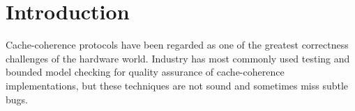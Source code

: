 \documentclass[sigplan,10pt,review,anonymous,screen]{acmart}\settopmatter{printfolios=true,printccs=false,printacmref=false}
\begin{document}
\newcommand{\amsgi}[1]{\ensuremath{#1^{\textrm{init}}}}
\newcommand{\amsge}[1]{\ensuremath{#1^{\textrm{end}}}}

\newcommand{\hseq}[2]{\ensuremath{#1 \parallel #2}}
\newcommand{\hsrzl}[2]{\ensuremath{\mathit{Serializable}\ #1\ #2}}
\newcommand{\hsrz}[1]{\ensuremath{\mathit{Serializable}\ #1}}

\newcommand{\strsn}[2]{\ensuremath{#1 \sswarrow_{s} #2}}
\newcommand{\hsseq}[3]{\ensuremath{#1 \parallel_{#3} #2}}


\newcommand*\rdrecsm[1]{
  \adjustbox{raise=.1ex, margin=-1pt}{
    \tikz[baseline=(char.base)]{
      \node[shape=rectangle, draw, inner sep=0pt, minimum size=7pt, fill=white, text=mordantred19]
      (char) {\scriptsize\sffamily\bf #1};}}
}
\newcommand*\blrecsm[1]{
  \adjustbox{raise=.1ex, margin=-1pt}{
    \tikz[baseline=(char.base)]{
      \node[shape=rectangle, draw, inner sep=0pt, minimum size=7pt, fill=white, text=mediumtealblue]
      (char) {\scriptsize\sffamily\bf #1};}}
}

\newcommand*\rdcircf[1]{
  \adjustbox{raise=.2ex, margin=-2pt}{
    \tikz[baseline=(char.base)]{
      \node[shape=circle, inner sep=0pt, minimum size=8pt, fill=mordantred19, text=white]
      (char) {\tiny\sffamily #1};}}
}
\newcommand*\blcircf[1]{
  \adjustbox{raise=.2ex, margin=-2pt}{
    \tikz[baseline=(char.base)]{
      \node[shape=circle, inner sep=0pt, minimum size=8pt, fill=mediumtealblue, text=white]
      (char) {\tiny\sffamily #1};}}
}

\newcommand{\rdmsg}[2]{{\color{mordantred19}\rdrecsm{#1}{\sf #2}}}
\newcommand{\rdmsgsm}[2]{\rdmsg{#1}{\small #2}}
\newcommand{\blmsg}[2]{{\color{mediumtealblue}\blrecsm{#1}{\sf #2}}}
\newcommand{\blmsgsm}[2]{\blmsg{#1}{\small #2}}


\maketitle

\section{Introduction}
\label{sec-intro}

Cache-coherence protocols have been regarded as one of the greatest correctness challenges of the hardware world.
Industry has most commonly used testing and bounded model checking for quality assurance of cache-coherence implementations, but these techniques are not sound and sometimes miss subtle bugs.%
\end{document}
